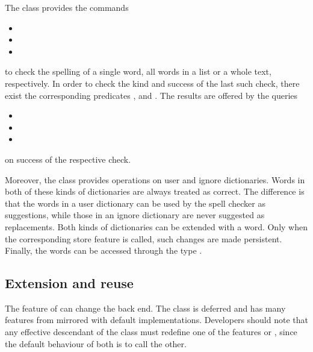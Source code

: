 \documentclass[paper=a4]{scrartcl}
\begin{document}


The class  provides the commands
\begin{itemize}
\item {}
\item {}
\item {}
\end{itemize}
to check the spelling of a single word, all words in a list or a whole text, respectively. In order to check the kind and success of the last such check, there exist the corresponding predicates ,  and . The results are offered by the queries
\begin{itemize}
\item {}
\item {}
\item {}
\end{itemize}
on success of the respective check.

Moreover, the class  provides operations on user and ignore dictionaries. Words in both of these kinds of dictionaries are always treated as correct. The difference is that the words in a user dictionary can be used by the spell checker as suggestions, while those in an ignore dictionary are never suggested as replacements. Both kinds of dictionaries can be extended with a word. Only when the corresponding store feature is called, such changes are made persistent. Finally, the words can be accessed through the type .

\subsection{Extension and reuse}

The feature  of  can change the back end. The class  is deferred and has many features from  mirrored with default implementations. Developers should note that any effective descendant of the class  must redefine one of the features  or , since the default behaviour of both is to call the other.
\end{document}
